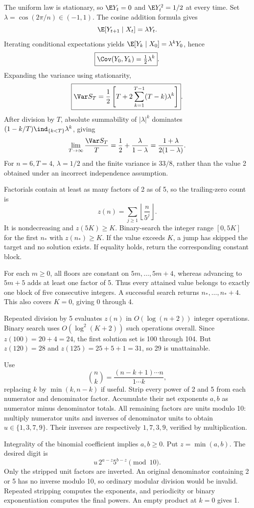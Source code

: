 The uniform law is stationary, so $\E Y_t=0$ and $\E Y_t^2=1/2$ at every time. Set $\lambda=\cos(2\pi/n)\in(-1,1)$. The cosine addition formula gives
\[
\E[Y_{t+1}\mid X_t]=\lambda Y_t.
\]
Iterating conditional expectations yields $\E[Y_k\mid X_0]=\lambda^kY_0$, hence
\[
\boxed{\Cov(Y_0,Y_k)=\tfrac12\lambda^k}.
\]
Expanding the variance using stationarity,
\[
\boxed{\Var S_T=\frac12\left[T+
2\sum_{k=1}^{T-1}(T-k)\lambda^k\right]}.
\]
After division by $T$, absolute summability of $|\lambda|^k$ dominates $(1-k/T)\ind_{\{k<T\}}\lambda^k$, giving
\[
\lim_{T\to\infty}\frac{\Var S_T}{T}
=\frac12+\frac{\lambda}{1-\lambda}
=\frac{1+\lambda}{2(1-\lambda)}.
\]
For $n=6,T=4$, $\lambda=1/2$ and the finite variance is $33/8$, rather than the value 2 obtained under an incorrect independence assumption.

Factorials contain at least as many factors of 2 as of 5, so the trailing-zero count is
\[
z(n)=\sum_{j\ge1}\left\lfloor\frac n{5^j}\right\rfloor.
\]
It is nondecreasing and $z(5K)\ge K$. Binary-search the integer range $[0,5K]$ for the first $n_*$ with $z(n_*)\ge K$. If the value exceeds $K$, a jump has skipped the target and no solution exists. If equality holds, return the corresponding constant block.

For each $m\ge0$, all floors are constant on $5m,\ldots,5m+4$, whereas advancing to $5m+5$ adds at least one factor of 5. Thus every attained value belongs to exactly one block of five consecutive integers. A successful search returns $n_*,\ldots,n_*+4$. This also covers $K=0$, giving 0 through 4.

Repeated division by 5 evaluates $z(n)$ in $O(\log(n+2))$ integer operations. Binary search uses $O(\log^2(K+2))$ such operations overall. Since $z(100)=20+4=24$, the first solution set is 100 through 104. But $z(120)=28$ and $z(125)=25+5+1=31$, so 29 is unattainable.

Use
\[
\binom nk=\frac{(n-k+1)\cdots n}{1\cdots k},
\]
replacing $k$ by $\min(k,n-k)$ if useful. Strip every power of 2 and 5 from each numerator and denominator factor. Accumulate their net exponents $a,b$ as numerator minus denominator totals. All remaining factors are units modulo 10: multiply numerator units and inverses of denominator units to obtain $u\in\{1,3,7,9\}$. Their inverses are respectively $1,7,3,9$, verified by multiplication.

Integrality of the binomial coefficient implies $a,b\ge0$. Put $z=\min(a,b)$. The desired digit is
\[
\boxed{u\,2^{a-z}5^{b-z}\pmod{10}}.
\]
Only the stripped unit factors are inverted. An original denominator containing 2 or 5 has no inverse modulo 10, so ordinary modular division would be invalid. Repeated stripping computes the exponents, and periodicity or binary exponentiation computes the final powers. An empty product at $k=0$ gives 1.

